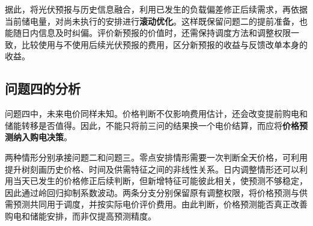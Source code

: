 据此，将光伏预报与历史信息融合，利用已发生的负载偏差修正后续需求，再依据当前储电量，对尚未执行的安排进行\textbf{滚动优化}。这样既保留问题二的提前准备，也能随日内信息及时纠偏。评价新预报的价值时，还需保持调度方法和调整权限一致，比较使用与不使用后续光伏预报的费用，区分新预报的收益与反馈改单本身的收益。

\subsection{问题四的分析}

问题四中，未来电价同样未知。价格判断不仅影响费用估计，还会改变提前购电和储能转移是否值得。因此，不能只将前三问的结果换一个电价结算，而应将\textbf{价格预测纳入购电决策}。

两种情形分别承接问题二和问题三。零点安排情形需要一次判断全天价格，可利用提升树刻画历史价格、时间及供需特征之间的非线性关系。日内调整情形还可以利用当天已发生的价格修正后续判断，但新增特征可能彼此相关，使预测不够稳定，因此通过岭回归抑制系数波动。两条分支分别保留原有调整权限，将价格预测与供需预测共同用于调度，并按实际电价评价费用。由此判断，价格预测能否真正改善购电和储能安排，而非仅提高预测精度。
